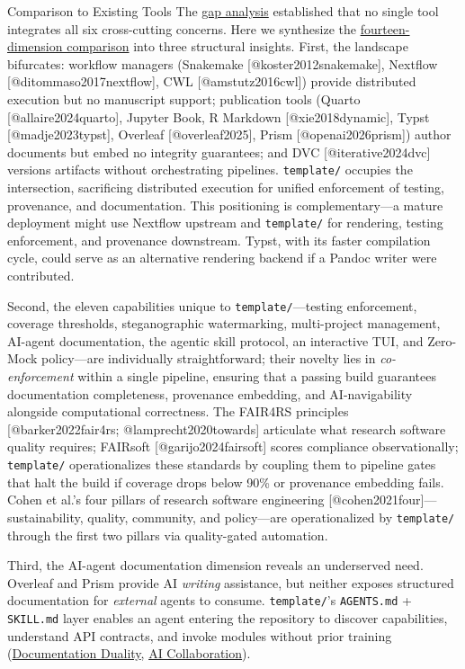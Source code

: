 \documentclass[
  ignorenonframetext,
]{beamer}
\author{\texorpdfstring{}{}}
\date{}
\begin{document}
\begin{frame}[fragile]{Comparison to Existing Tools}
\protect{}\label{comparison-to-existing-tools}
The \href{02_introduction.md\#the-gap}{gap analysis} established that no
single tool integrates all six cross-cutting concerns. Here we
synthesize the
\href{08f_appendix_matrix.md\#appendix-matrix}{fourteen-dimension
comparison} into three structural insights. First, the landscape
bifurcates: workflow managers (Snakemake {[}@koster2012snakemake{]},
Nextflow {[}@ditommaso2017nextflow{]}, CWL {[}@amstutz2016cwl{]})
provide distributed execution but no manuscript support; publication
tools (Quarto {[}@allaire2024quarto{]}, Jupyter Book, R Markdown
{[}@xie2018dynamic{]}, Typst {[}@madje2023typst{]}, Overleaf
{[}@overleaf2025{]}, Prism {[}@openai2026prism{]}) author documents but
embed no integrity guarantees; and DVC {[}@iterative2024dvc{]} versions
artifacts without orchestrating pipelines. \texttt{template/} occupies
the intersection, sacrificing distributed execution for unified
enforcement of testing, provenance, and documentation. This positioning
is complementary---a mature deployment might use Nextflow upstream and
\texttt{template/} for rendering, testing enforcement, and provenance
downstream. Typst, with its faster compilation cycle, could serve as an
alternative rendering backend if a Pandoc writer were contributed.

Second, the eleven capabilities unique to \texttt{template/}---testing
enforcement, coverage thresholds, steganographic watermarking,
multi-project management, AI-agent documentation, the agentic skill
protocol, an interactive TUI, and Zero-Mock policy---are individually
straightforward; their novelty lies in \emph{co-enforcement} within a
single pipeline, ensuring that a passing build guarantees documentation
completeness, provenance embedding, and AI-navigability alongside
computational correctness. The FAIR4RS principles {[}@barker2022fair4rs;
@lamprecht2020towards{]} articulate what research software quality
requires; FAIRsoft {[}@garijo2024fairsoft{]} scores compliance
observationally; \texttt{template/} operationalizes these standards by
coupling them to pipeline gates that halt the build if coverage drops
below 90\% or provenance embedding fails. Cohen et al.'s four pillars of
research software engineering {[}@cohen2021four{]}---sustainability,
quality, community, and policy---are operationalized by
\texttt{template/} through the first two pillars via quality-gated
automation.

Third, the AI-agent documentation dimension reveals an underserved need.
Overleaf and Prism provide AI \emph{writing} assistance, but neither
exposes structured documentation for \emph{external} agents to consume.
\texttt{template/}'s \texttt{AGENTS.md} + \texttt{SKILL.md} layer
enables an agent entering the repository to discover capabilities,
understand API contracts, and invoke modules without prior training
(\href{03c_documentation.md\#documentation-duality-and-ai-collaboration}{Documentation
Duality}, \href{05d_ai_collaboration.md\#the-ai-collaboration-model}{AI
Collaboration}).


\end{frame}
\end{document}
